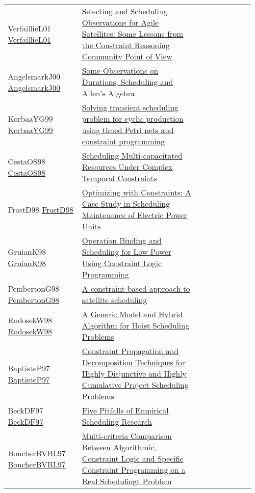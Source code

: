 {\begin{longtable}{p{3cm}p{7cm}lllllll}
VerfaillieL01 \href{https://doi.org/10.1007/3-540-45578-7\_55}{VerfaillieL01} &  \href{papers/VerfaillieL01.pdf}{Selecting and Scheduling Observations for Agile Satellites: Some Lessons from the Constraint Reasoning Community Point of View} &  &  &  &  &  &  & \\
AngelsmarkJ00 \href{https://doi.org/10.1007/3-540-45349-0\_35}{AngelsmarkJ00} &  \href{papers/AngelsmarkJ00.pdf}{Some Observations on Durations, Scheduling and Allen's Algebra} &  &  &  &  &  &  & \\
KorbaaYG99 \href{https://doi.org/10.23919/ECC.1999.7099947}{KorbaaYG99} &  \href{papers/KorbaaYG99.pdf}{Solving transient scheduling problem for cyclic production using timed Petri nets and constraint programming} &  &  &  &  &  &  & \\
CestaOS98 \href{https://doi.org/10.1007/3-540-49481-2\_36}{CestaOS98} &  \href{papers/CestaOS98.pdf}{Scheduling Multi-capacitated Resources Under Complex Temporal Constraints} &  &  &  &  &  &  & \\
FrostD98 \href{https://doi.org/10.1007/3-540-49481-2\_40}{FrostD98} &  \href{papers/FrostD98.pdf}{Optimizing with Constraints: {A} Case Study in Scheduling Maintenance of Electric Power Units} &  &  &  &  &  &  & \\
GruianK98 \href{https://doi.org/10.1109/EURMIC.1998.711781}{GruianK98} &  \href{papers/GruianK98.pdf}{Operation Binding and Scheduling for Low Power Using Constraint Logic Programming} &  &  &  &  &  &  & \\
PembertonG98 \href{https://doi.org/10.1090/dimacs/057/06}{PembertonG98} &  \href{papers/PembertonG98.pdf}{A constraint-based approach to satellite scheduling} &  &  &  &  &  &  & \\
RodosekW98 \href{https://doi.org/10.1007/3-540-49481-2\_28}{RodosekW98} &  \href{papers/RodosekW98.pdf}{A Generic Model and Hybrid Algorithm for Hoist Scheduling Problems} &  &  &  &  &  &  & \\
BaptisteP97 \href{https://doi.org/10.1007/BFb0017454}{BaptisteP97} &  \href{papers/BaptisteP97.pdf}{Constraint Propagation and Decomposition Techniques for Highly Disjunctive and Highly Cumulative Project Scheduling Problems} &  &  &  &  &  &  & \\
BeckDF97 \href{https://doi.org/10.1007/BFb0017455}{BeckDF97} &  \href{papers/BeckDF97.pdf}{Five Pitfalls of Empirical Scheduling Research} &  &  &  &  &  &  & \\
BoucherBVBL97 \href{}{BoucherBVBL97} &  \href{papers/BoucherBVBL97.pdf}{Multi-criteria Comparison Between Algorithmic, Constraint Logic and Specific Constraint Programming on a Real Schedulingt Problem} &  &  &  &  &  &  & \\

\end{longtable}}
